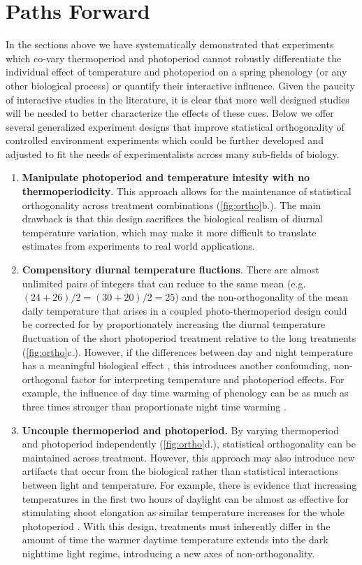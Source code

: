 \documentclass[11pt]{article}
\begin{document}
\section{Paths Forward}
In the sections above we have systematically demonstrated that experiments which co-vary thermoperiod and photoperiod cannot robustly differentiate the individual effect of temperature and photoperiod on a spring phenology (or any other biological process) or quantify their interactive influence. Given the paucity of interactive studies in the literature, it is clear that more well designed studies will be needed to better characterize the effects of these cues. Below we offer several generalized experiment designs that improve statistical orthogonality of controlled environment experiments which could be further developed and adjusted to fit the needs of experimentalists across many sub-fields of biology.
\begin{enumerate}
\item \textbf{Manipulate photoperiod and temperature intesity with no thermoperiodicity}. This approach allows for the maintenance of statistical orthogonality across treatment combinations (\ref{fig:ortho}b.). The main drawback is that this design sacrifices the biological realism of diurnal temperature variation, which may make it more difficult to translate estimates from experiments to real world applications.

\item \textbf{Compensitory diurnal temperature fluctions}. There are almost unlimited pairs of integers that can reduce to the same mean (e.g. $(24+26)/2 = (30+20)/2 = 25$) and the non-orthogonality of the mean daily temperature that arises in a coupled photo-thermoperiod design could be corrected for by proportionately increasing the diurnal temperature fluctuation of the short photoperiod treatment relative to the long treatments (\ref{fig:ortho}c.). However, if the differences between day and night temperature has a meaningful biological effect \citep{}, this introduces another confounding, non-orthogonal factor for interpreting temperature and photoperiod effects. For example, the influence of day time warming of phenology can be as much as three times stronger than proportionate night time warming \citep{}.

\item \textbf{Uncouple thermoperiod and photoperiod.} By varying thermoperiod and photoperiod independently (\ref{fig:ortho}d.), statistical orthogonality can be maintained across treatment. However, this approach may also introduce new artifacts that occur from the biological rather than statistical interactions between light and temperature. For example, there is evidence that increasing temperatures in the first two hours of daylight can be almost as effective for stimulating shoot elongation as similar temperature increases for the whole photoperiod \citep{Erwin1998}. With this design, treatments must inherently differ in the amount of time the warmer daytime temperature extends into the dark nighttime light regime, introducing a new axes of non-orthogonality.
\end{enumerate}
\end{document}
